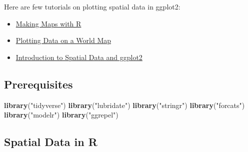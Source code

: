 \documentclass[]{book}
\newenvironment{Shaded}{\begin{snugshade}}{\end{snugshade}}
\newcommand{\KeywordTok}[1]{\textcolor[rgb]{0.13,0.29,0.53}{\textbf{#1}}}
\newcommand{\DataTypeTok}[1]{\textcolor[rgb]{0.13,0.29,0.53}{#1}}
\newcommand{\StringTok}[1]{\textcolor[rgb]{0.31,0.60,0.02}{#1}}
\newcommand{\CommentTok}[1]{\textcolor[rgb]{0.56,0.35,0.01}{\textit{#1}}}
\newcommand{\NormalTok}[1]{#1}
\providecommand{\tightlist}{%
  \setlength{\itemsep}{0pt}\setlength{\parskip}{0pt}}
\theoremstyle{definition}
\theoremstyle{definition}
\theoremstyle{definition}
\theoremstyle{remark}
\begin{document}
Here are few tutorials on plotting spatial data in ggplot2:

\begin{itemize}
\tightlist
\item
  \href{http://eriqande.github.io/rep-res-web/lectures/making-maps-with-R.html}{Making
  Maps with R}
\item
  \href{https://www.r-bloggers.com/r-beginners-plotting-locations-on-to-a-world-map/}{Plotting
  Data on a World Map}
\item
  \href{https://rpubs.com/m_dev/Intro-to-Spatial-Data-and-ggplot2}{Introduction
  to Spatial Data and ggplot2}
\end{itemize}

\subsection*{Prerequisites}\label{prerequisites-6}

\begin{Shaded}
\begin{Highlighting}[]
\KeywordTok{library}\NormalTok{(}\StringTok{"tidyverse"}\NormalTok{)}
\KeywordTok{library}\NormalTok{(}\StringTok{"lubridate"}\NormalTok{)}
\KeywordTok{library}\NormalTok{(}\StringTok{"stringr"}\NormalTok{)}
\KeywordTok{library}\NormalTok{(}\StringTok{"forcats"}\NormalTok{)}
\KeywordTok{library}\NormalTok{(}\StringTok{"modelr"}\NormalTok{)}
\KeywordTok{library}\NormalTok{(}\StringTok{"ggrepel"}\NormalTok{)}
\end{Highlighting}
\end{Shaded}

\subsection{Spatial Data in R}\label{spatial-data-in-r}

\begin{Shaded}
\end{Shaded}
\end{document}
